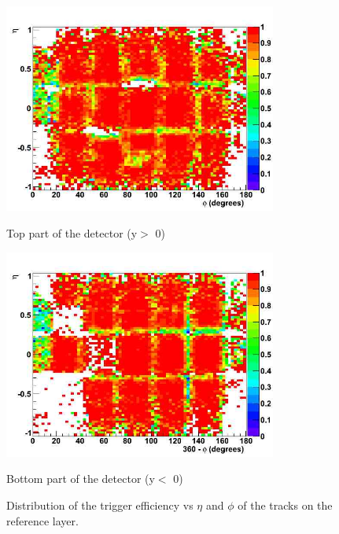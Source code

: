 \begin{figure}[hbtp]

 \begin{minipage}{1.0\textwidth}
  \begin{center}
 
     \includegraphics[width=0.8\textwidth]{eff_eta_phi_top_09}
       \caption{Top part of the detector (y$ > $ 0) }
  \end{center}
  \end{minipage}
     \begin{minipage}{1.0\textwidth}
     \begin{center}
      \includegraphics[width=0.8\textwidth]{eff_eta_phi_bot_09}
       \caption{Bottom part of the detector (y$ < $ 0) }
  \end{center}
  \end{minipage}
     
      \caption{Distribution of the trigger efficiency vs $\eta$ and $\phi$ of the tracks on the reference layer.}
      \label{fig:eff_eta_phi_09}

\end{figure}





